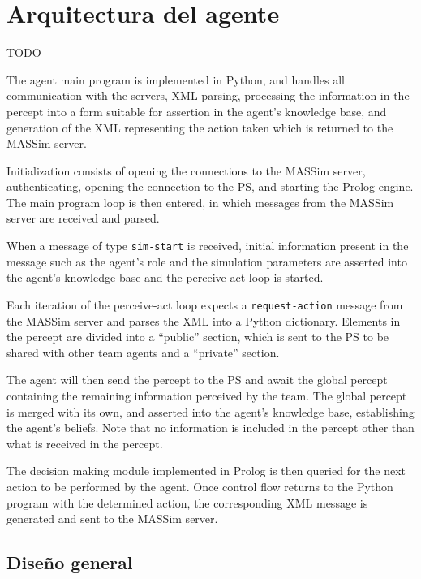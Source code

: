 \section{Arquitectura del agente}
 \label{sec:arquitectura_agente}

 TODO

 The agent main program is implemented in Python, and handles all
 communication with the servers, XML parsing, processing the information in
 the percept into a form suitable for assertion in the agent's knowledge
 base, and generation of the XML representing the action taken which is
 returned to the MASSim server.

 Initialization consists of opening the connections to the MASSim server,
 authenticating, opening the connection to the PS, and starting
 the Prolog engine. The main program loop is then entered, in which messages
 from the MASSim server are received and parsed. 

 When a message of type \texttt{sim-start} is received, initial information
 present in the message such as the agent's role and the simulation
 parameters are asserted into the agent's knowledge base and the perceive-act
 loop is started.

 Each iteration of the perceive-act loop expects a \texttt{request-action}
 message from the MASSim server and parses the XML into a Python dictionary.
 Elements in the percept are divided into a ``public'' section, which is sent
 to the PS to be shared with other team agents and a ``private''
 section.

 The agent will then send the percept to the PS and await the global percept
 containing the remaining information perceived by the team. The global
 percept is merged with its own, and asserted into the agent's knowledge
 base, establishing the agent's beliefs.  Note that no information is
 included in the percept other than what is received in the percept.

 The decision making module implemented in Prolog is then queried for the
 next action to be performed by the agent.  Once control flow returns to the
 Python program with the determined action, the corresponding XML message is
 generated and sent to the MASSim server. 

\subsection{Diseño general}
 \label{sub:diseno_general}
  
